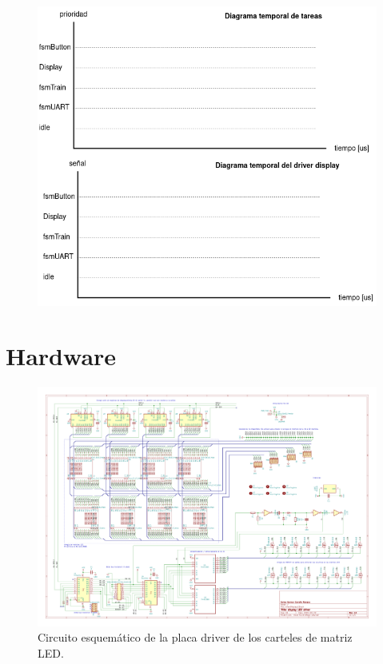 \begin{figure}[ht]
	\centering
	\includegraphics[width=1\textwidth]{./Figures/diagramasTemporales.png}
	\caption{}
	\label{fig:diagramasTemporales}
\end{figure}

\pagebreak
\section{Hardware}

\begin{figure}[ht]
	\centering
	\includegraphics[width=1\textwidth]{./Figures/output.driverLED.pdf}
	\caption{Circuito esquemático de la placa driver de los carteles de matriz LED.}
	\label{fig:schDriverLED}
\end{figure}

